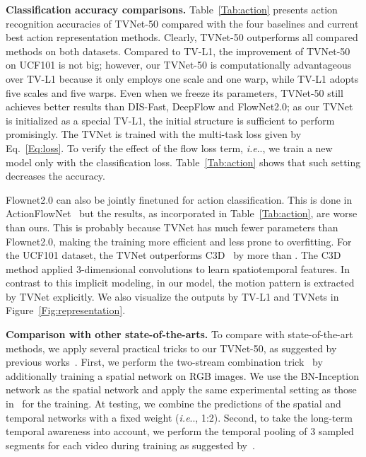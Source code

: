 \documentclass[10pt,twocolumn,letterpaper]{article}
\makeatletter
\DeclareRobustCommand\onedot{\futurelet\@let@token\@onedot}
\def\@onedot{\ifx\@let@token.\else.\null\fi\xspace}
\def\ie{\emph{i.e}\onedot} \def\Ie{\emph{I.e}\onedot}
\makeatother
\begin{document}
\textbf{Classification accuracy comparisons.}
Table~\ref{Tab:action} presents action recognition accuracies of TVNet-50 compared with the four baselines and current best action representation methods.
Clearly, TVNet-50 outperforms all compared methods on both datasets. Compared to TV-L1, the improvement of TVNet-50 on UCF101 is not big; however, our TVNet-50 is computationally advantageous over TV-L1 because it only employs one scale and one warp, while TV-L1 adopts five scales and five warps.  Even when we freeze its parameters, TVNet-50 still achieves better results than DIS-Fast, DeepFlow and FlowNet2.0; as our TVNet is initialized as a special TV-L1, the initial structure is sufficient to perform promisingly.
The TVNet is trained with the multi-task loss given by Eq.~\eqref{Eq:loss}. To verify the effect of the flow loss term, \ie ,
we train a new model only with the classification loss. Table~\ref{Tab:action} shows that such setting  decreases the accuracy.

Flownet2.0 can also be jointly finetuned for action classification. This is done in ActionFlowNet~\cite{ng2016actionflownet} but the results, as incorporated in Table~\ref{Tab:action}, are worse than ours. This is probably because TVNet has much fewer parameters than Flownet2.0, making the training more efficient and less prone to overfitting.
For the UCF101 dataset, the TVNet outperforms C3D~\cite{tran2015learning} by more than . The C3D method applied 3-dimensional convolutions to learn spatiotemporal features. In contrast to this implicit modeling, in our model, the motion pattern is extracted by TVNet explicitly.
We also visualize the outputs by TV-L1 and TVNets in Figure~\ref{Fig:representation}.




\textbf{Comparison with other state-of-the-arts.}
To compare with state-of-the-art methods, we apply several practical tricks to our TVNet-50, as suggested by previous works~\cite{Simonyan_NIPS14,Wang_ECCV16}. First, we perform the two-stream combination trick~\cite{Simonyan_NIPS14} by additionally training a spatial network on RGB images. We use the BN-Inception network as the spatial network and apply the same experimental setting as those in~\cite{Wang_ECCV16} for the training. At testing, we combine the predictions of the spatial and temporal networks with a fixed weight (\ie, 1:2). Second, to take the long-term temporal awareness into account, we perform the temporal pooling of 3 sampled segments for each video during training as suggested by~\cite{Wang_ECCV16}.
\end{document}
